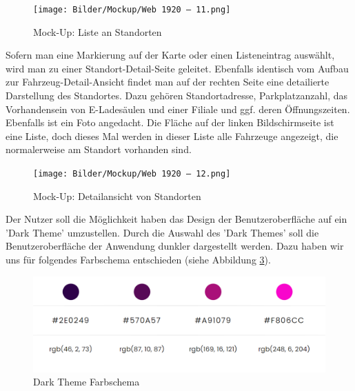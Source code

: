 \begin{figure}[!ht]
    \centering
    \texttt{[image: Bilder/Mockup/Web 1920 – 11.png]}
    \caption{Mock-Up: Liste an Standorten}
    \label{mu:standortliste}
\end{figure}


Sofern man eine Markierung auf der Karte oder einen Listeneintrag auswählt, wird man zu einer Standort-Detail-Seite geleitet. Ebenfalls identisch vom Aufbau zur Fahrzeug-Detail-Ansicht findet man auf der rechten Seite eine detailierte Darstellung des Standortes. Dazu gehören Standortadresse, Parkplatzanzahl, das Vorhandensein von E-Ladesäulen und einer Filiale und ggf. deren Öffnungszeiten. Ebenfalls ist ein Foto angedacht. Die Fläche auf der linken Bildschirmseite ist eine Liste, doch dieses Mal werden in dieser Liste alle Fahrzeuge angezeigt, die normalerweise am Standort vorhanden sind.  

\begin{figure}[!ht]
    \centering
    \texttt{[image: Bilder/Mockup/Web 1920 – 12.png]}
    \caption{Mock-Up: Detailansicht von Standorten}
    \label{mu:standortdetails}
\end{figure}








Der Nutzer soll die Möglichkeit haben das Design der Benutzeroberfläche auf ein 'Dark Theme' umzustellen. Durch die Auswahl des 'Dark Themes' soll die Benutzeroberfläche der Anwendung dunkler dargestellt werden. Dazu haben wir uns für folgendes Farbschema entschieden (siehe Abbildung \ref{mu:darkmode}).

\begin{figure}[!ht]
    \centering
    \includegraphics[width=\textwidth]{Bilder/Mockup/colorscheme_darkmode.PNG}
    \caption{Dark Theme Farbschema}
    \label{mu:darkmode}
\end{figure}